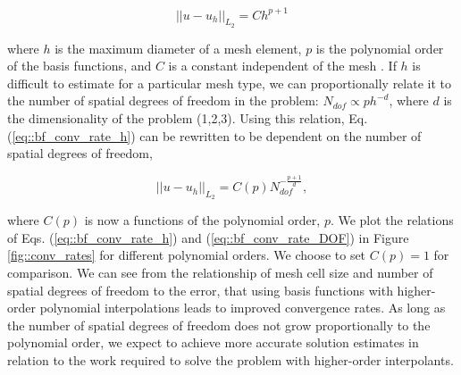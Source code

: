 \documentclass[11pt]{article}
\begin{document}
\begin{equation}
\label{eq::bf_conv_rate_h}
|| u - u_h ||_{L_2} = C h^{p+1}
\end{equation}

\noindent where $h$ is the maximum diameter of a mesh element, $p$ is the polynomial order of the basis functions, and $C$ is a constant independent of the mesh \cite{bramble1970estimation}. If $h$ is difficult to estimate for a particular mesh type, we can proportionally relate it to the number of spatial degrees of freedom in the problem: $N_{dof} \propto p h^{-d}$, where $d$ is the dimensionality of the problem (1,2,3). Using this relation, Eq. (\ref{eq::bf_conv_rate_h}) can be rewritten to be dependent on the number of spatial degrees of freedom,

\begin{equation}
\label{eq::bf_conv_rate_DOF}
|| u - u_h ||_{L_2} = C(p) N_{dof}^{- \frac{p+1}{d}},
\end{equation}

\noindent where $C(p)$ is now a functions of the polynomial order, $p$. We plot the relations of Eqs. (\ref{eq::bf_conv_rate_h}) and (\ref{eq::bf_conv_rate_DOF}) in Figure \ref{fig::conv_rates} for different polynomial orders. We choose to set $C(p)=1$ for comparison. We can see from the relationship of mesh cell size and number of spatial degrees of freedom to the error, that using basis functions with higher-order polynomial interpolations leads to improved convergence rates. As long as the number of spatial degrees of freedom does not grow proportionally to the polynomial order, we expect to achieve more accurate solution estimates in relation to the work required to solve the problem with higher-order interpolants.
\end{document}
